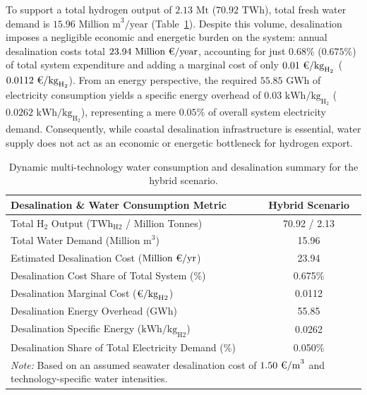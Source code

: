 \documentclass[preprint,12pt]{elsarticle}
\begin{document}
To support a total hydrogen output of $2.13\text{~Mt}$ ($70.92\text{~TWh}$), total fresh water demand is $15.96\text{~Million~m}^3/\text{year}$ (Table~\ref{tab:water_demand_hybrid}). Despite this volume, desalination imposes a negligible economic and energetic burden on the system: annual desalination costs total $23.94\text{~Million~\texteuro/year}$, accounting for just $0.68\%$ ($0.675\%$) of total system expenditure and adding a marginal cost of only $0.01\text{~\texteuro/kg}_{\text{H}_2}$ ($0.0112\text{~\texteuro/kg}_{\text{H}_2}$). From an energy perspective, the required $55.85\text{~GWh}$ of electricity consumption yields a specific energy overhead of $0.03\text{~kWh/kg}_{\text{H}_2}$ ($0.0262\text{~kWh/kg}_{\text{H}_2}$), representing a mere $0.05\%$ of overall system electricity demand. Consequently, while coastal desalination infrastructure is essential, water supply does not act as an economic or energetic bottleneck for hydrogen export.

\begin{table}[htbp]
\centering
\caption{Dynamic multi-technology water consumption and desalination summary for the hybrid scenario.}
\label{tab:water_demand_hybrid}
\begin{tabular}{lc}
\toprule
Desalination \& Water Consumption Metric & Hybrid Scenario \\
\midrule
Total $\text{H}_2$ Output ($\text{TWh}_{\text{H2}}$ / Million Tonnes) & 70.92 / 2.13 \\
Total Water Demand ($\text{Million~m}^3$) & 15.96 \\
Estimated Desalination Cost ($\text{Million~\texteuro/yr}$) & 23.94 \\
Desalination Cost Share of Total System (\%) & 0.675\% \\
Desalination Marginal Cost ($\text{\texteuro/kg}_{\text{H2}}$) & 0.0112 \\
Desalination Energy Overhead ($\text{GWh}$) & 55.85 \\
Desalination Specific Energy ($\text{kWh/kg}_{\text{H2}}$) & 0.0262 \\
Desalination Share of Total Electricity Demand (\%) & 0.050\% \\
\bottomrule
\multicolumn{2}{p{0.68\textwidth}}{\footnotesize \textit{Note:} Based on an assumed seawater desalination cost of $1.50\text{~\texteuro/m}^3$ and technology-specific water intensities.}
\end{tabular}
\end{table}

\end{document}
